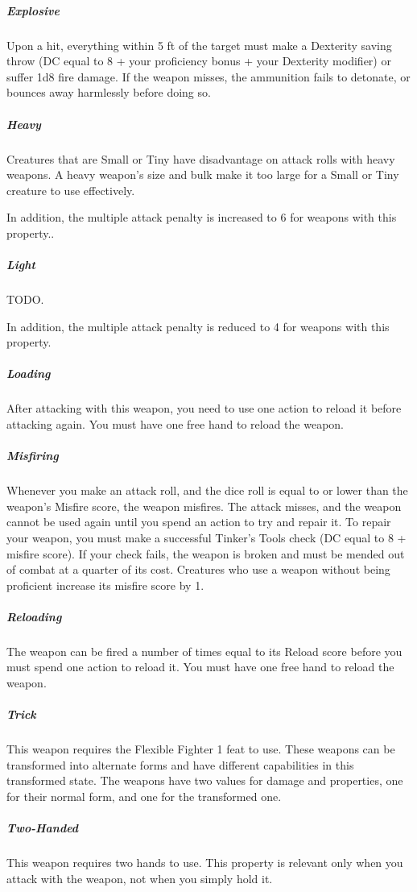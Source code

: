     \subparagraph{Explosive} Upon a hit, everything within 5 ft of the target must make a Dexterity saving throw (DC equal to 8 + your proficiency bonus + your Dexterity modifier) or suffer 1d8 fire damage.
    If the weapon misses, the ammunition fails to detonate, or bounces away harmlessly before doing so.


    \subparagraph{Heavy} Creatures that are Small or Tiny have disadvantage on attack rolls with heavy weapons.
    A heavy weapon's size and bulk make it too large for a Small or Tiny creature to use effectively.

    In addition, the multiple attack penalty is increased to 6 for weapons with this property..

    \subparagraph{Light} TODO.

    In addition, the multiple attack penalty is reduced to 4 for weapons with this property.

    \subparagraph{Loading} After attacking with this weapon, you need to use one action to reload it before attacking again.
    You must have one free hand to reload the weapon.

    \subparagraph{Misfiring} Whenever you make an attack roll, and the dice roll is equal to or lower than the weapon’s Misfire score, the weapon misfires.
    The attack misses, and the weapon cannot be used again until you spend an action to try and repair it.
    To repair your weapon, you must make a successful Tinker’s Tools check (DC equal to 8 + misfire score).
    If your check fails, the weapon is broken and must be mended out of combat at a quarter of its cost.
    Creatures who use a weapon without being proficient increase its misfire score by 1.

    \subparagraph{Reloading} The weapon can be fired a number of times equal to its Reload score before you must spend one action to reload it.
    You must have one free hand to reload the weapon.

    \subparagraph{Trick} This weapon requires the Flexible Fighter 1 feat to use.
    These weapons can be transformed into alternate forms and have different capabilities in this transformed state.
    The weapons have two values for damage and properties, one for their normal form, and one for the transformed one.

    \subparagraph{Two-Handed} This weapon requires two hands to use.
    This property is relevant only when you attack with the weapon, not when you simply hold it.
